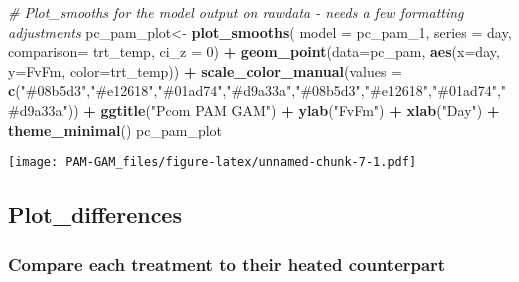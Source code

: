 \documentclass[
]{article}
\newenvironment{Shaded}{\begin{snugshade}}{\end{snugshade}}
\newcommand{\AttributeTok}[1]{\textcolor[rgb]{0.13,0.29,0.53}{#1}}
\newcommand{\CommentTok}[1]{\textcolor[rgb]{0.56,0.35,0.01}{\textit{#1}}}
\newcommand{\DecValTok}[1]{\textcolor[rgb]{0.00,0.00,0.81}{#1}}
\newcommand{\FunctionTok}[1]{\textcolor[rgb]{0.13,0.29,0.53}{\textbf{#1}}}
\newcommand{\NormalTok}[1]{#1}
\newcommand{\OtherTok}[1]{\textcolor[rgb]{0.56,0.35,0.01}{#1}}
\newcommand{\SpecialCharTok}[1]{\textcolor[rgb]{0.81,0.36,0.00}{\textbf{#1}}}
\newcommand{\StringTok}[1]{\textcolor[rgb]{0.31,0.60,0.02}{#1}}
\begin{document}
\begin{Shaded}
\begin{Highlighting}[]
\CommentTok{\# Plot\_smooths for the model output on rawdata {-} needs a few formatting adjustments}
\NormalTok{pc\_pam\_plot}\OtherTok{\textless{}{-}}
  \FunctionTok{plot\_smooths}\NormalTok{(}
  \AttributeTok{model =}\NormalTok{ pc\_pam\_1,}
\AttributeTok{series =}\NormalTok{ day,}
\AttributeTok{comparison=}\NormalTok{ trt\_temp,}
\AttributeTok{ci\_z =} \DecValTok{0}\NormalTok{) }\SpecialCharTok{+} 
  \FunctionTok{geom\_point}\NormalTok{(}\AttributeTok{data=}\NormalTok{pc\_pam, }
             \FunctionTok{aes}\NormalTok{(}\AttributeTok{x=}\NormalTok{day, }\AttributeTok{y=}\NormalTok{FvFm, }\AttributeTok{color=}\NormalTok{trt\_temp)) }\SpecialCharTok{+}
  \FunctionTok{scale\_color\_manual}\NormalTok{(}\AttributeTok{values =} \FunctionTok{c}\NormalTok{(}\StringTok{"\#08b5d3"}\NormalTok{,}\StringTok{"\#e12618"}\NormalTok{,}\StringTok{"\#01ad74"}\NormalTok{,}\StringTok{"\#d9a33a"}\NormalTok{,}\StringTok{"\#08b5d3"}\NormalTok{,}\StringTok{"\#e12618"}\NormalTok{,}\StringTok{"\#01ad74"}\NormalTok{,}\StringTok{"\#d9a33a"}\NormalTok{)) }\SpecialCharTok{+} 
  \FunctionTok{ggtitle}\NormalTok{(}\StringTok{"Pcom PAM GAM"}\NormalTok{) }\SpecialCharTok{+}
  \FunctionTok{ylab}\NormalTok{(}\StringTok{"FvFm"}\NormalTok{) }\SpecialCharTok{+}
  \FunctionTok{xlab}\NormalTok{(}\StringTok{"Day"}\NormalTok{) }\SpecialCharTok{+}
  \FunctionTok{theme\_minimal}\NormalTok{()}
\NormalTok{pc\_pam\_plot}
\end{Highlighting}
\end{Shaded}

\texttt{[image: PAM-GAM\_files/figure-latex/unnamed-chunk-7-1.pdf]}

\hypertarget{plot_differences}{%
\subsection{Plot\_differences}\label{plot_differences}}

\hypertarget{compare-each-treatment-to-their-heated-counterpart}{%
\subsubsection{Compare each treatment to their heated
counterpart}\label{compare-each-treatment-to-their-heated-counterpart}}
\end{document}
